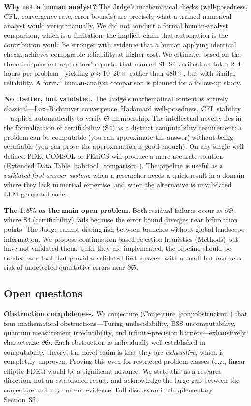\documentclass[11pt,a4paper]{article}
\newcommand{\Sclass}{\mathfrak{S}}
\begin{document}
\textbf{Why not a human analyst?} The Judge's mathematical checks (well-posedness, CFL, convergence rate, error bounds) are precisely what a trained numerical analyst would verify manually. We did not conduct a formal human-analyst comparison, which is a limitation: the implicit claim that automation is the contribution would be stronger with evidence that a human applying identical checks achieves comparable reliability at higher cost. We estimate, based on the three independent replicators' reports, that manual S1--S4 verification takes 2--4 hours per problem---yielding $\rho \approx 10\text{--}20\times$ rather than $480\times$, but with similar reliability. A formal human-analyst comparison is planned for a follow-up study.

\textbf{Not better, but validated.} The Judge's mathematical content is entirely classical---Lax--Richtmyer convergence, Hadamard well-posedness, CFL stability---applied automatically to verify $\Sclass$ membership. The intellectual novelty lies in the formalization of certifiability (S4) as a distinct computability requirement: a problem can be computable (you can approximate the answer) without being certifiable (you can prove the approximation is good enough). On any single well-defined PDE, COMSOL or FEniCS will produce a more accurate solution (Extended Data Table~\ref{tab:tool_comparison}). The pipeline is useful as a \emph{validated first-answer system}: when a researcher needs a quick result in a domain where they lack numerical expertise, and when the alternative is unvalidated LLM-generated code.

\textbf{The 1.5\% as the main open problem.} Both residual failures occur at $\partial \Sclass$, where S4 (certifiability) fails because the error bound diverges near bifurcation points. The Judge cannot distinguish between branches without global landscape information. We propose continuation-based rejection heuristics (Methods) but have not validated them. Until they are implemented, the pipeline should be treated as a tool that provides validated first answers with a small but non-zero risk of undetected qualitative errors near $\partial \Sclass$.

\subsection{Open questions}

\textbf{Obstruction completeness.} We conjecture (Conjecture~\ref{conj:obstruction}) that four mathematical obstructions---Turing undecidability, BSS uncomputability, quantum measurement irreducibility, and infinite-precision barriers---exhaustively characterize $\partial \Sclass$. Each obstruction is individually well-established in computability theory; the novel claim is that they are \emph{exhaustive}, which is completely unproven. Proving this even for restricted problem classes (e.g., linear elliptic PDEs) would be a significant advance. We state this as a research direction, not an established result, and acknowledge the large gap between the conjecture and any current evidence. Full discussion in Supplementary Section~S2.
\end{document}
